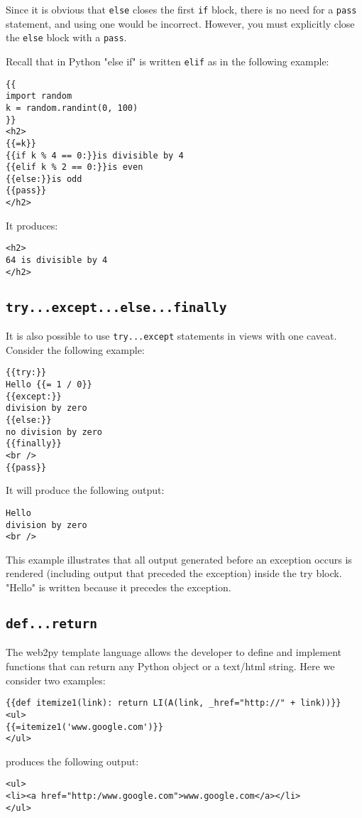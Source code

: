 \documentclass[justified,sixbynine,notoc]{tufte-book}
\def\ft{\small\tt}
\def\inxx#1{\index{#1}}
\begin{document}
\begin{fullwidth}
Since it is obvious that {\ft else} closes the first {\ft if} block, there is no need for a {\ft pass} statement, and using one would be incorrect. However, you must explicitly close the {\ft else} block with a {\ft pass}.

Recall that in Python "else if" is written {\ft elif} as in the following example:
\begin{lstlisting}[keywords={}]
{{
import random
k = random.randint(0, 100)
}}
<h2>
{{=k}}
{{if k % 4 == 0:}}is divisible by 4
{{elif k % 2 == 0:}}is even
{{else:}}is odd
{{pass}}
</h2>
\end{lstlisting}

It produces:
\begin{lstlisting}[keywords={}]
<h2>
64 is divisible by 4
</h2>
\end{lstlisting}

\goodbreak\subsection{{\ft try...except...else...finally}}

\inxx{try} \inxx{except} \inxx{else} \inxx{finally}

It is also possible to use {\ft try...except} statements in views with one caveat. Consider the following example:
\begin{lstlisting}[keywords={}]
{{try:}}
Hello {{= 1 / 0}}
{{except:}}
division by zero
{{else:}}
no division by zero
{{finally}}
<br />
{{pass}}
\end{lstlisting}

It will produce the following output:
\begin{lstlisting}
Hello
division by zero
<br />
\end{lstlisting}

This example illustrates that all output generated before an exception occurs is rendered (including output that preceded the exception) inside the try block. "Hello" is written because it precedes the exception.

\goodbreak\subsection{{\ft def...return}}

\inxx{def} \inxx{return}

The web2py template language allows the developer to define and implement functions that can return any Python object or a text/html string. Here we consider two examples:
\begin{lstlisting}[keywords={}]
{{def itemize1(link): return LI(A(link, _href="http://" + link))}}
<ul>
{{=itemize1('www.google.com')}}
</ul>
\end{lstlisting}
\noindent produces the following output:
\begin{lstlisting}[keywords={}]
<ul>
<li><a href="http:/www.google.com">www.google.com</a></li>
</ul>
\end{lstlisting}


\end{fullwidth}
\end{document}

